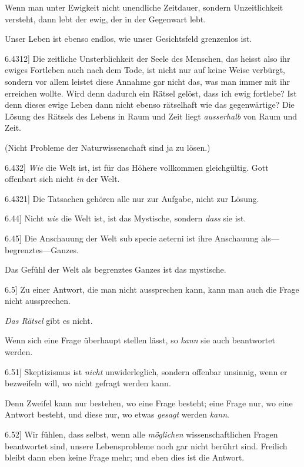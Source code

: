 \documentclass[12pt,oneside]{book}[2007/10/19]
\newcommand{\PropERef}[1]{\hyperref[PropE:#1]{#1}}
\newcommand{\PropositionG}[2]{%
  \item[\phantomsection\label{PropG:#1}\PropERef{#1}] #2%
}
\newcommand{\Emph}[1]{\emph{#1}}%
\begin{document}
\begin{propositions}
{Wenn man unter Ewigkeit nicht unendliche
Zeitdauer, sondern Unzeitlichkeit versteht, dann
lebt der ewig, der in der Gegenwart lebt.

Unser Leben ist ebenso endlos, wie unser
Gesichtsfeld grenzenlos ist.}


\PropositionG{6.4312}
{Die zeitliche Unsterblichkeit der Seele des
Menschen, das heisst also ihr ewiges Fortleben
auch nach dem Tode, ist nicht nur auf keine Weise
verbürgt, sondern vor allem leistet diese Annahme
gar nicht das, was man immer mit ihr erreichen
wollte. Wird denn dadurch ein Rätsel gelöst, dass
ich ewig fortlebe? Ist denn dieses ewige Leben
dann nicht ebenso rätselhaft wie das gegenwärtige?
Die Lösung des Rätsels des Lebens in Raum und
Zeit liegt \Emph{ausserhalb} von Raum und Zeit.

(Nicht Probleme der Naturwissenschaft sind ja
zu lösen.)}


\PropositionG{6.432}
{\Emph{Wie} die Welt ist, ist für das Höhere vollkommen
\enlargethispage{1pt} %
gleichgültig. Gott offenbart sich nicht \Emph{in}
der Welt.}


\PropositionG{6.4321}
{Die Tatsachen gehören alle nur zur Aufgabe,
nicht zur Lösung.}


\PropositionG{6.44}
{Nicht \Emph{wie} die Welt ist, ist das Mystische,
sondern \Emph{dass} sie ist.}


\PropositionG{6.45}
{Die Anschauung der Welt sub specie aeterni
ist ihre Anschauung als---be\-grenz\-tes---Gan\-zes.

Das Gefühl der Welt als begrenztes Ganzes ist
das mystische.}


\PropositionG{6.5}
{Zu einer Antwort, die man nicht aussprechen
kann, kann man auch die Frage nicht aussprechen.

\Emph{Das Rätsel} gibt es nicht.

Wenn sich eine Frage überhaupt stellen lässt,
so \Emph{kann} sie auch beantwortet werden.}


\PropositionG{6.51}
{Skeptizismus ist \Emph{nicht} unwiderleglich, sondern
offenbar unsinnig, wenn er bezweifeln will, wo
nicht gefragt werden kann.

Denn Zweifel kann nur bestehen, wo eine Frage
besteht; eine Frage nur, wo eine Antwort besteht,
und diese nur, wo etwas \Emph{gesagt} werden \Emph{kann}.}


\PropositionG{6.52}
{Wir fühlen, dass selbst, wenn alle \Emph{möglichen}
wissenschaftlichen Fragen beantwortet sind, unsere
Lebensprobleme noch gar nicht berührt sind.
Freilich bleibt dann eben keine Frage mehr; und
eben dies ist die Antwort.}



\end{propositions}
\end{document}
